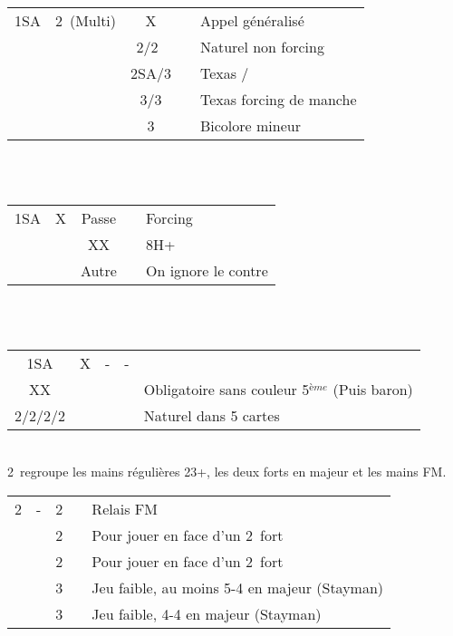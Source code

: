 \documentclass[a4paper, oneside, 11pt]{report}
\begin{document}
		\begin{tabular}{cccc|l}
		1SA & 2\carreau\ (Multi) & X && Appel généralisé\\
		&& 2\coeur/2\pique\ && Naturel non forcing\\
		&& 2SA/3\trefle && Texas \trefle/\carreau\\
		&& 3\carreau/3\coeur && Texas forcing de manche\\
		&& 3\pique && Bicolore mineur\\
		\end{tabular}\\\\

		\begin{tabular}{cccc|l}
		1SA & X & Passe && Forcing\\
		&& XX && 8H+\\
                  && Autre && On ignore le contre\\
		\end{tabular}\\\\

		\begin{tabular}{cccc|l}
		1SA & X & - & - & \\
                  XX &&&& Obligatoire sans couleur 5$^{ème}$ (Puis baron)\\
		2\trefle/2\carreau/2\coeur/2\pique &&&& Naturel dans 5 cartes\\
		\end{tabular}\\

	2\trefle\ regroupe les mains régulières 23+, les deux forts en majeur et les mains FM.\\
	
	\begin{tabular}{cccc|l}
	2\trefle & - & 2\carreau && Relais FM\\
	&& 2\coeur && Pour jouer en face d'un 2\coeur\ fort\\
	&& 2\pique && Pour jouer en face d'un 2\pique\ fort\\
	&& 3\trefle && Jeu faible, au moins 5-4 en majeur (Stayman)\\
	&& 3\carreau && Jeu faible, 4-4 en majeur (Stayman)\\
	\end{tabular}\\\\
	
\end{document}
